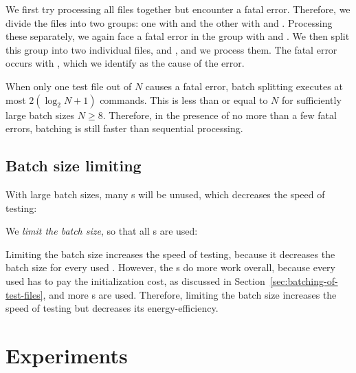 \documentclass[final]{ltugboat}
\begin{document}
\medskip
\noindent
\begingroup
\centering

\par
\endgroup

\medskip
\noindent
We first try processing all files together but encounter a fatal error. Therefore, we divide the files into two groups: one with  and the other with  and . Processing these separately, we again face a fatal error in the group with  and . We then split this group into two individual files,  and , and we process them. The fatal error occurs with , which we identify as the cause of the error.

When only one test file out of $N$ causes a fatal error, batch splitting executes at most $2 (\log_2 N + 1)$ commands. This is less than or equal to $N$ for sufficiently large batch sizes $N\geq 8$. Therefore, in the presence of no more than a few fatal errors, batching is still faster than sequential processing.

\subsection{Batch size limiting}

With large batch sizes, many s will be unused, which decreases the speed of testing:

\smallskip
\noindent
\begingroup
\centering

\par
\endgroup

\smallskip
\noindent
We \emph{limit the batch size}, so that all s are used:

\smallskip
\noindent
\begingroup
\centering

\par
\endgroup

\smallskip
Limiting the batch size increases the speed of testing, because it decreases the batch size for every used . However, the s do more work overall, because every used  has to pay the initialization cost, as discussed in Section~\ref{sec:batching-of-test-files}, and more s are used. Therefore, limiting the batch size increases the speed of testing but decreases its energy-efficiency.

\section{Experiments}
\label{sec:experiments}
\end{document}

